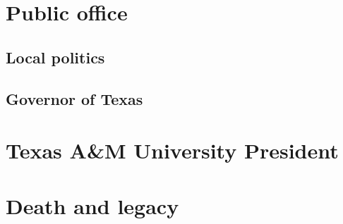 \documentclass[12pt]{article}
\begin{document}
\section{Public office}

\subsection{Local politics}

\subsection{Governor of Texas}

\newpage
\section{Texas A\&M University President}

\newpage
\section{Death and legacy}

\newpage
\printbibliography

\end{document}
